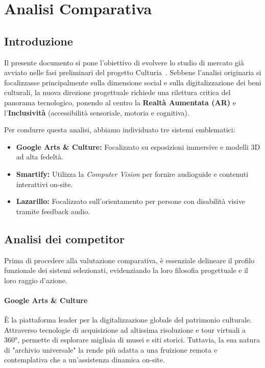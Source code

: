 \section{Analisi Comparativa}

\subsection{Introduzione}
Il presente documento si pone l'obiettivo di evolvere lo studio di mercato già avviato nelle fasi preliminari del progetto Culturia~\cite{culturia_repo}. Sebbene l'analisi originaria si focalizzasse principalmente sulla dimensione social e sulla digitalizzazione dei beni culturali, la nuova direzione progettuale richiede una rilettura critica del panorama tecnologico, ponendo al centro la \textbf{Realtà Aumentata (AR)} e l'\textbf{Inclusività} (accessibilità sensoriale, motoria e cognitiva).

Per condurre questa analisi, abbiamo individuato tre sistemi emblematici:
\begin{itemize}
    \item \textbf{Google Arts \& Culture:} Focalizzato su esposizioni immersive e modelli 3D ad alta fedeltà.
    \item \textbf{Smartify:} Utilizza la \textit{Computer Vision} per fornire audioguide e contenuti interattivi on-site.
    \item \textbf{Lazarillo:} Focalizzato sull'orientamento per persone con disabilità visive tramite feedback audio.
\end{itemize}

\subsection{Analisi dei competitor}
Prima di procedere alla valutazione comparativa, è essenziale delineare il profilo funzionale dei sistemi selezionati, evidenziando la loro filosofia progettuale e il loro raggio d'azione.

\paragraph{Google Arts \& Culture} È la piattaforma leader per la digitalizzazione globale del patrimonio culturale. Attraverso tecnologie di acquisizione ad altissima risoluzione e tour virtuali a 360°, permette di esplorare migliaia di musei e siti storici. Tuttavia, la sua natura di "archivio universale" la rende più adatta a una fruizione remota e contemplativa che a un'assistenza dinamica on-site.

